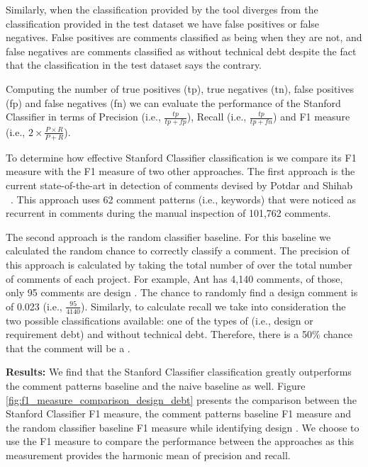 Similarly, when the classification provided by the tool diverges from the classification provided in the test dataset we have false positives or false negatives. False positives are comments classified as being \SATD when they are not, and false negatives are comments classified as without technical debt despite the fact that the classification in the test dataset says the contrary.

Computing the number of true positives (tp), true negatives (tn), false positives (fp) and false negatives (fn) we can evaluate the performance of the Stanford Classifier in terms of Precision (i.e., $\frac{tp}{tp + fp}$), Recall (i.e., $\frac{tp}{tp + fn}$) and F1 measure (i.e., $2 \times \frac{P \times R}{P + R}$).

To determine how effective Stanford Classifier classification is we compare its F1 measure with the F1 measure of two other approaches. The first approach is the current state-of-the-art in detection of \SATD comments devised by Potdar and Shihab ~\cite{Potdar2014ICSME}. This approach uses 62 comment patterns (i.e., keywords) that were noticed as recurrent in \SATD comments during the manual inspection of 101,762 comments. 

The second approach is the random classifier baseline. For this baseline we calculated the random chance to correctly classify a \SATD comment. The precision of this approach is calculated by taking the total number of \SATD over the total number of comments of each project. For example, Ant has 4,140 comments, of those, only 95 comments are design \SATD. The chance to randomly find a design \SATD comment is of 0.023 (i.e., $\frac{95}{4140}$). Similarly, to calculate recall  we take into consideration the two possible classifications available: one of the types of \SATD (i.e., design or requirement debt) and without technical debt. Therefore, there is a 50\% chance that the comment will be a \SATD. 


\vspace{1mm}

\noindent \textbf{Results:} We find that the Stanford Classifier classification greatly outperforms the comment patterns baseline and the naive baseline as well. Figure \ref{fig:f1_measure_comparison_design_debt} presents the comparison between the Stanford Classifier F1 measure, the comment patterns baseline F1 measure and the random classifier baseline F1 measure while identifying design \SATD. We choose to use the F1 measure to compare the performance between the approaches as this measurement provides the harmonic mean of precision and recall.


